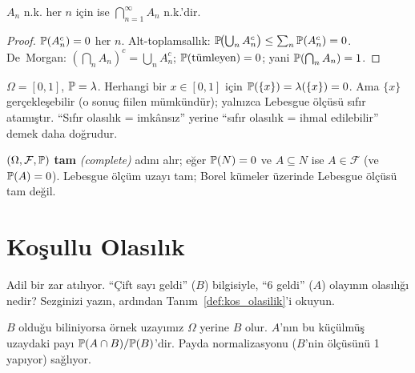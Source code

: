 \begin{onerme}\label{prop:nk_birlesim}
$A_n$ n.k. her $n$ için ise $\bigcap_{n=1}^\infty A_n$ n.k.'dir.
\end{onerme}

\begin{proof}
$\mathbb{P}(A_n^c) = 0$ her $n$. Alt-toplamsallık:
$\mathbb{P}\!\bigl(\bigcup_n A_n^c\bigr) \leq \sum_n \mathbb{P}(A_n^c) = 0$.
De~Morgan: $\left(\bigcap_n A_n\right)^c = \bigcup_n A_n^c$; $\mathbb{P}(\text{tümleyen}) = 0$;
yani $\mathbb{P}(\bigcap_n A_n) = 1$.
\end{proof}

\begin{hataanalizi}
$\Omega = [0,1]$, $\mathbb{P} = \lambda$. Herhangi bir $x \in [0,1]$ için
$\mathbb{P}(\{x\}) = \lambda(\{x\}) = 0$. Ama $\{x\}$ gerçekleşebilir
(o sonuç fiilen mümkündür); yalnızca Lebesgue ölçüsü sıfır atamıştır.
``Sıfır olasılık = imkânsız'' yerine ``sıfır olasılık = ihmal edilebilir'' demek daha doğrudur.
\end{hataanalizi}

\begin{tanim}\label{def:tamuzay}
$(\Omega,\mathcal{F},\mathbb{P})$ \textbf{tam} \emph{(complete)} adını alır; eğer
$\mathbb{P}(N)=0$ ve $A \subseteq N$ ise $A \in \mathcal{F}$ (ve $\mathbb{P}(A)=0$).
Lebesgue ölçüm uzayı tam; Borel kümeler üzerinde Lebesgue ölçüsü tam değil.
\end{tanim}


\section{Koşullu Olasılık}

\begin{kesif}
Adil bir zar atılıyor. ``Çift sayı geldi'' ($B$) bilgisiyle, ``6 geldi'' ($A$)
olayının olasılığı nedir? Sezginizi yazın, ardından Tanım~\ref{def:kos_olasilik}'i okuyun.
\end{kesif}

\begin{tanimgerekce}
$B$ olduğu biliniyorsa örnek uzayımız $\Omega$ yerine $B$ olur. $A$'nın bu
küçülmüş uzaydaki payı $\mathbb{P}(A \cap B) / \mathbb{P}(B)$'dir. Payda normalizasyonu
($B$'nin ölçüsünü 1 yapıyor) sağlıyor.
\end{tanimgerekce}


